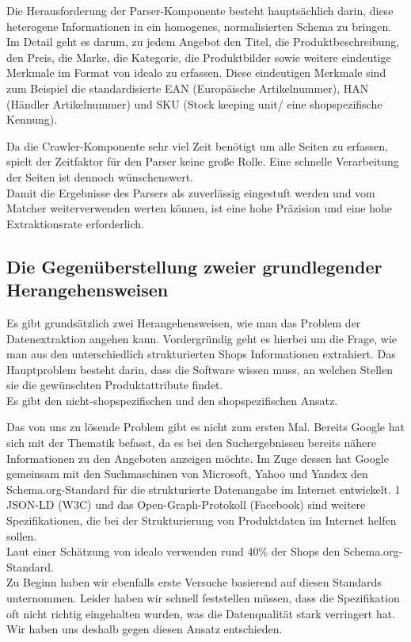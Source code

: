 Die Herausforderung der Parser-Komponente besteht hauptsächlich darin, diese heterogene Informationen in ein homogenes, normalisierten Schema zu bringen. Im Detail geht es darum, zu jedem Angebot den Titel, die Produktbeschreibung, den Preis, die Marke, die Kategorie, die Produktbilder sowie weitere eindeutige Merkmale im Format von idealo zu erfassen. Diese eindeutigen Merkmale sind zum Beispiel die standardisierte EAN (Europäische Artikelnummer), HAN (Händler Artikelnummer) und SKU (Stock keeping unit/ eine shopspezifische Kennung).

Da die Crawler-Komponente sehr viel Zeit benötigt um alle Seiten zu erfassen, spielt der Zeitfaktor für den Parser keine große Rolle. Eine schnelle Verarbeitung der Seiten ist dennoch wünschenswert.\\
Damit die Ergebnisse des Parsers als zuverlässig eingestuft werden und vom Matcher weiterverwenden werten können, ist eine hohe Präzision und eine hohe Extraktionsrate erforderlich.

\subsection{Die Gegenüberstellung zweier grundlegender Herangehensweisen}
\label{sec:Einleitung-Gegenueberstellung}


Es gibt grundsätzlich zwei Herangehensweisen, wie man das Problem der Datenextraktion angehen kann. Vordergründig geht es hierbei um die Frage, wie man aus den unterschiedlich strukturierten Shops Informationen extrahiert. Das Hauptproblem besteht darin, dass die Software wissen muss, an welchen Stellen sie die gewünschten Produktattribute findet.\\
Es gibt den nicht-shopspezifischen und den shopspezifischen Ansatz.

Das von uns zu lösende Problem gibt es nicht zum ersten Mal. Bereits Google hat sich mit der Thematik befasst, da es bei den Suchergebnissen bereits nähere Informationen zu den Angeboten anzeigen möchte. Im Zuge dessen hat Google gemeinsam mit den Suchmaschinen von Microsoft, Yahoo und Yandex den Schema.org-Standard für die strukturierte Datenangabe im Internet entwickelt. 1 JSON-LD (W3C) und das Open-Graph-Protokoll (Facebook) sind weitere Spezifikationen, die bei der Strukturierung von Produktdaten im Internet helfen sollen.\\
Laut einer Schätzung von idealo verwenden rund 40\% der Shops den Schema.org-Standard.\\
Zu Beginn haben wir ebenfalls erste Versuche basierend auf diesen Standards unternommen. Leider haben wir schnell feststellen müssen, dass die Spezifikation oft nicht richtig eingehalten wurden, was die Datenqualität stark verringert hat. Wir haben uns deshalb gegen diesen Ansatz entschieden.

